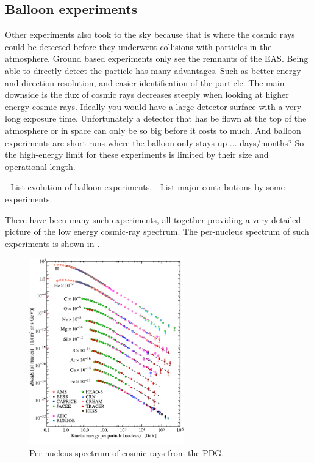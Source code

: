 \subsection{Balloon experiments}

Other experiments also took to the sky because that is where the cosmic rays could be detected before they underwent collisions with particles in the atmosphere. Ground based experiments only see the remnants of the EAS. Being able to directly detect the particle has many advantages. Such as better energy and direction resolution, and easier identification of the particle. The main downside is the flux of cosmic rays decreases steeply when looking at higher energy cosmic rays. Ideally you would have a large detector surface with a very long exposure time. Unfortunately a detector that has be flown at the top of the atmosphere or in space can only be so big before it costs to much. And balloon experiments are short runs where the balloon only stays up ... days/months? So the high-energy limit for these experiments is limited by their size and operational length.

- List evolution of balloon experiments.
- List major contributions by some experiments.

There have been many such experiments, all together providing a very detailed picture of the low energy cosmic-ray spectrum. The per-nucleus spectrum of such experiments is shown in .

\begin{figure}
    \centering
    \includegraphics[width=0.6\textwidth]
                    {plots/cosmic-rays/PDG_28_1_fluxes_per_nucleus}
    \caption{Per nucleus spectrum of cosmic-rays from the PDG.}
    \label{fig:low_e_spectrum}
\end{figure}


